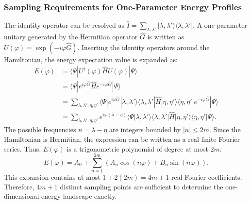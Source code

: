 \documentclass[
 reprint,
 amsmath,amssymb,
 aps,
 physrev,
]{revtex4-2}
\begin{document}
\subsubsection{Sampling Requirements for One-Parameter Energy Profiles}
%
The identity operator can be resolved as \( \hat{I} = \sum_{\lambda, \lambda'} |\lambda, \lambda'\rangle \langle \lambda, \lambda'| \). A one-parameter unitary generated by the Hermitian operator \( \hat{G} \) is written as \( U(\varphi) = \exp(-i \varphi \hat{G}) \).
Inserting the identity operators around the Hamiltonian, the energy expectation value is expanded as:
%
\begin{equation}
    \begin{split}
        E(\varphi) & = \langle \Psi | U^{\dagger}(\varphi) \hat{H} U(\varphi) | \Psi \rangle                                                                                                                                                  \\
                   & = \langle \Psi | e^{i \varphi \hat{G}} \hat{H} e^{-i \varphi \hat{G}} | \Psi \rangle                                                                                                                                     \\
                   & = \sum_{\lambda, \lambda', \eta, \eta'} \langle \Psi | e^{i \varphi \hat{G}} |\lambda, \lambda'\rangle \langle \lambda, \lambda'| \hat{H} |\eta, \eta'\rangle \langle \eta, \eta'| e^{-i \varphi \hat{G}} | \Psi \rangle \\
                   & = \sum_{\lambda, \lambda', \eta, \eta'} e^{i \varphi (\lambda - \eta)} \langle \Psi |\lambda, \lambda'\rangle \langle \lambda, \lambda'| \hat{H} |\eta, \eta'\rangle \langle \eta, \eta'| \Psi \rangle.
    \end{split}
\end{equation}
%
The possible frequencies \( n = \lambda - \eta \) are integers bounded by \( |n|\leq 2m \). Since the Hamiltonian is Hermitian, the expression can be written as a real finite Fourier series. Thus, \( E(\varphi) \) is a trigonometric polynomial of degree at most \( 2m \):
%
\begin{equation}
    \label{eq:fourier_expansion}
    E(\varphi) = A_0 + \sum_{n=1}^{2m} \left( A_n \cos(n\varphi) + B_n \sin(n \varphi) \right).
\end{equation}
%
This expansion contains at most \( 1 + 2(2m) = 4m+1 \) real Fourier coefficients. Therefore, \( 4m+1 \) distinct sampling points are sufficient to determine the one-dimensional energy landscape exactly.
\end{document}
